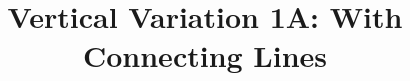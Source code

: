 \documentclass[11pt]{article}
\begin{document}
\title{Vertical Variation 1A: With Connecting Lines}
\date{}
\maketitle

\end{document}
